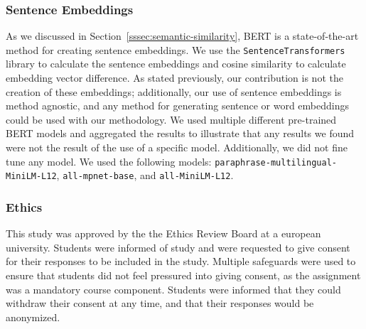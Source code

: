 \subsubsection{Sentence Embeddings}
\label{ssec:method-embeddings}

As we discussed in Section~\ref{sssec:semantic-similarity}, BERT is a state-of-the-art method for creating sentence embeddings. We use the \texttt{SentenceTransformers} library to calculate the sentence embeddings and cosine similarity to calculate embedding vector difference. As stated previously, our contribution is not the creation of these embeddings; additionally, our use of sentence embeddings is method agnostic, and any method for generating sentence or word embeddings could be used with our methodology. We used multiple different pre-trained BERT models and aggregated the results to illustrate that any results we found were not the result of the use of a specific model. Additionally, we did not fine tune any model. We used the following models: \texttt{paraphrase-multilingual-MiniLM-L12}, \texttt{all-mpnet-base}, and \texttt{all-MiniLM-L12}.

\subsubsection{Ethics}
\label{ssec:ethics}
This study was approved by the the Ethics Review Board at a european university\anonfoot. Students were informed of study and were requested to give consent for their responses to be included in the study. Multiple safeguards were used to ensure that students did not feel pressured into giving consent, as the assignment was a mandatory course component. Students were informed that they could withdraw their consent at any time, and that their responses would be anonymized. 






